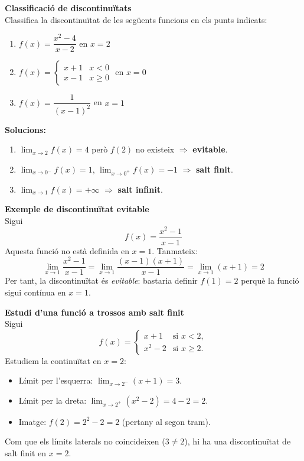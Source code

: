 \documentclass[12pt]{article}
\begin{document}
\begin{exemple}
\textbf{Classificació de discontinuïtats}\\
Classifica la discontinuïtat de les següents funcions en els punts indicats:
\begin{enumerate}
    \item $f(x)=\dfrac{x^2-4}{x-2}$ en $x=2$
    \item $f(x)=\begin{cases} x+1 & x<0 \\ x-1 & x\ge 0 \end{cases}$ en $x=0$
    \item $f(x)=\dfrac{1}{(x-1)^2}$ en $x=1$
\end{enumerate}
\textbf{Solucions:}
\begin{enumerate}
    \item $\lim_{x\to 2} f(x)=4$ però $f(2)$ no existeix $\Rightarrow$ \textbf{evitable}.
    \item $\lim_{x\to 0^-} f(x)=1$, $\lim_{x\to 0^+} f(x)=-1$ $\Rightarrow$ \textbf{salt finit}.
    \item $\lim_{x\to 1} f(x)=+\infty$ $\Rightarrow$ \textbf{salt infinit}.
\end{enumerate}
\end{exemple}

\begin{exemple}
\textbf{Exemple de discontinuïtat evitable}\\
Sigui 
\[
f(x)=\frac{x^2-1}{x-1}
\]
Aquesta funció no està definida en $x=1$. Tanmateix:
\[
\lim_{x\to 1} \frac{x^2-1}{x-1} = \lim_{x\to 1} \frac{(x-1)(x+1)}{x-1} = \lim_{x\to 1} (x+1)=2
\]
Per tant, la discontinuïtat és \textit{evitable}: bastaria definir $f(1)=2$ perquè la funció sigui contínua en $x=1$.
\end{exemple}

\begin{exemple}
\textbf{Estudi d'una funció a trossos amb salt finit}\\
Sigui 
\[
f(x) = \begin{cases} 
      x+1 & \text{si } x < 2, \\
      x^2-2 & \text{si } x \geq 2.
   \end{cases}
\]
Estudiem la continuïtat en $x=2$:
\begin{itemize}
    \item Límit per l'esquerra: $\lim_{x\to 2^-} (x+1) = 3$.
    \item Límit per la dreta: $\lim_{x\to 2^+} (x^2-2) = 4-2=2$.
    \item Imatge: $f(2)=2^2-2=2$ (pertany al segon tram).
\end{itemize}
Com que els límits laterals no coincideixen ($3\neq 2$), hi ha una discontinuïtat de salt finit en $x=2$.
\end{exemple}
\end{document}
